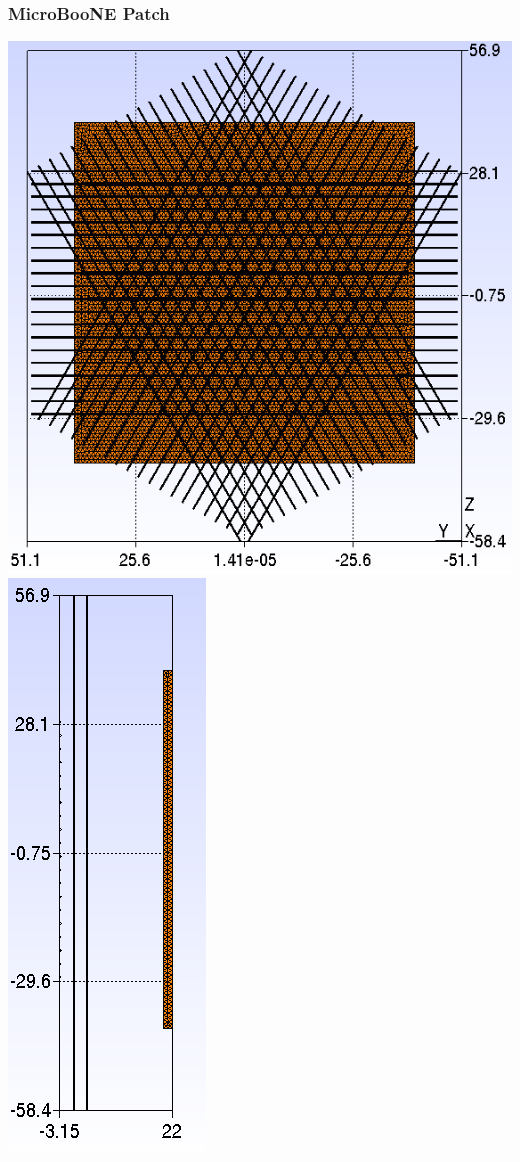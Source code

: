 \documentclass[xcolor=dvipsnames]{beamer}
\begin{document}
\begin{frame}
  \frametitle{MicroBooNE Patch}

  \begin{center}
    \includegraphics[height=0.7\textheight]{uboone-mesh-with-plate.png}%
    \includegraphics[height=0.7\textheight]{uboone-mesh-with-plate-side.png}      


\end{center}
\end{frame}
\end{document}

